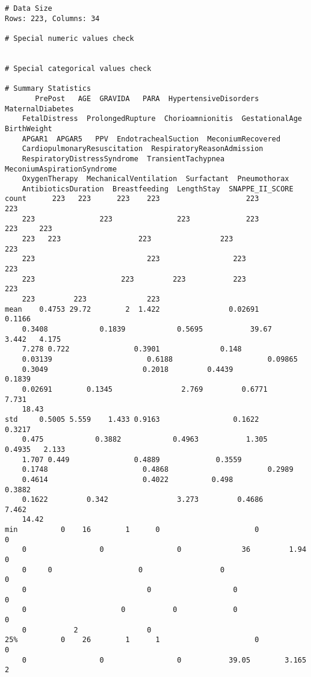 \documentclass[11pt]{article}
\begin{document}
\begin{Verbatim}[tabsize=4]
# Data Size
Rows: 223, Columns: 34

# Special numeric values check


# Special categorical values check

# Summary Statistics
       PrePost   AGE  GRAVIDA   PARA  HypertensiveDisorders  MaternalDiabetes
	FetalDistress  ProlongedRupture  Chorioamnionitis  GestationalAge  BirthWeight
	APGAR1  APGAR5   PPV  EndotrachealSuction  MeconiumRecovered
	CardiopulmonaryResuscitation  RespiratoryReasonAdmission
	RespiratoryDistressSyndrome  TransientTachypnea  MeconiumAspirationSyndrome
	OxygenTherapy  MechanicalVentilation  Surfactant  Pneumothorax
	AntibioticsDuration  Breastfeeding  LengthStay  SNAPPE_II_SCORE
count      223   223      223    223                    223               223
	223               223               223             223          223     223
	223   223                  223                223                           223
	223                          223                 223                         223
	223                    223         223           223                  223
	223         223              223
mean    0.4753 29.72        2  1.422                0.02691            0.1166
	0.3408            0.1839            0.5695           39.67        3.442   4.175
	7.278 0.722               0.3901              0.148
	0.03139                      0.6188                      0.09865
	0.3049                      0.2018         0.4439                 0.1839
	0.02691        0.1345                2.769         0.6771       7.731
	18.43
std     0.5005 5.559    1.433 0.9163                 0.1622            0.3217
	0.475            0.3882            0.4963           1.305       0.4935   2.133
	1.707 0.449               0.4889             0.3559
	0.1748                      0.4868                       0.2989
	0.4614                      0.4022          0.498                 0.3882
	0.1622         0.342                3.273         0.4686       7.462
	14.42
min          0    16        1      0                      0                 0
	0                 0                 0              36         1.94       0
	0     0                    0                  0                             0
	0                            0                   0                           0
	0                      0           0             0                    0
	0           2                0
25%          0    26        1      1                      0                 0
	0                 0                 0           39.05        3.165       2

\end{Verbatim}
\end{document}
